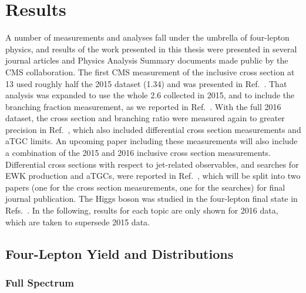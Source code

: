 
\chapter{Results}

A number of measurements and analyses fall under the umbrella of four-lepton physics, and results of the work presented in this thesis were presented in several journal articles and Physics Analysis Summary documents made public by the CMS collaboration.
The first CMS measurement of the {\ZZ} inclusive cross section at {13\TeV} used roughly half the 2015 dataset ({1.34\fbinv}) and was presented in Ref.~\cite{CMS:2015fnj}.
That analysis was expanded to use the whole {2.6\fbinv} collected in 2015, and to include the {\Zfourl} branching fraction measurement, as we reported in Ref.~\cite{Khachatryan:2016txa}.
With the full 2016 dataset, the {\ZZ} cross section and {\Zfourl} branching ratio were measured again to greater precision in Ref.~\cite{CMS:2017ruh}, which also included differential cross section measurements and aTGC limits.
An upcoming paper including these measurements will also include a combination of the 2015 and 2016 inclusive cross section measurements.
Differential cross sections with respect to jet-related observables, and searches for EWK {\ZZ} production and aTGCs, were reported in Ref.~\cite{CMS:2017dyw}, which will be split into two papers (one for the cross section measurements, one for the searches) for final journal publication.
The Higgs boson was studied in the four-lepton final state in Refs.~\cite{CMS:2016rqf,CMS:2016ilx,Sirunyan:2017exp}.
In the following, results for each topic are only shown for 2016 data, which are taken to supersede 2015 data.



\section{Four-Lepton Yield and Distributions}


\subsection{Full Spectrum}

